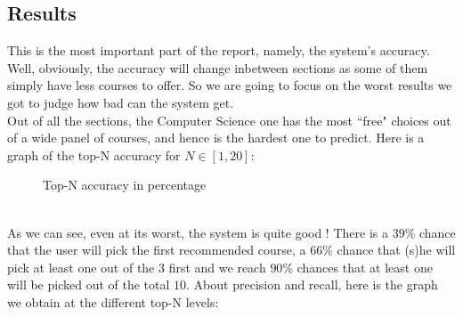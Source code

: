 \documentclass{article}
\begin{document}
    \subsection{Results}
        This is the most important part of the report, namely, the system's accuracy. Well, obviously, the accuracy will change inbetween sections as some of them simply have less courses to offer. So we are going to focus on the worst results we got to judge how bad can the system get.
        \\Out of all the sections, the Computer Science one has the most ``free" choices out of a wide panel of courses, and hence is the hardest one to predict. Here is a graph of the top-N accuracy for $N \in \left[1, 20\right]$:
\\\begin{figure}[h]
\centering
{}
  \caption{Top-N accuracy in percentage}
  \label{fig:topn}
\end{figure}
        \\As we can see, even at its worst, the system is quite good ! There is a $39\%$ chance that the user will pick the first recommended course, a $66\%$ chance that (s)he will pick at least one out of the $3$ first and we reach $90\%$ chances that at least one will be picked out of the total $10$. About precision and recall, here is the graph we obtain at the different top-N levels:
\end{document}

